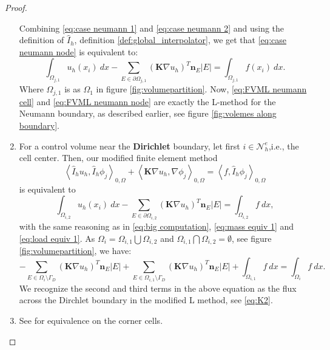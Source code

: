 \documentclass[../Main/main.tex]{subfiles}
\begin{document}
\begin{proof}
\begin{enumerate}
			Combining \eqref{eq:case neumann 1} and \eqref{eq:case neumann 2} and using the definition of $\hat{I}_h$, definition \ref{def:global_interpolator}, we get that \eqref{eq:case neumann node} is equivalent to:
			\begin{equation}\label{eq:FVML neumann node}
				\int_{\Omega_{j,1}}u_h(x_i) \ dx - \sum_{E\in \partial \Omega_{j,1}} (\bm{K}\nabla u_h)^T\bm{n}_E |E| = \int_{\Omega_{j,1}}f(x_i) \ dx.
			\end{equation}
			Where $\Omega_{j,1}$ is as $\Omega_1$ in figure \ref{fig:volumepartition}. Now, \eqref{eq:FVML neumann cell} and \eqref{eq:FVML neumann node} are exactly the L-method for the Neumann boundary, as described earlier, see figure \ref{fig:volemes along boundary}.  
			\item For a control volume near the \textbf{Dirichlet} boundary, let first $i\in \mathcal{N}_h^e$,i.e., the cell center. Then, our modified finite element method
			\begin{equation}
				\left \langle \hat{I}_h u_h,\hat{I}_h \phi_j \right \rangle_{0,\Omega} +   \left \langle\bm{K} \nabla u_h,\nabla \phi_j \right \rangle_{0,\Omega} = \left \langle f,\hat{I}_h \phi_j \right \rangle_{0,\Omega}
			\end{equation}   
			is equivalent to 
			\begin{equation} 
				\int_{\Omega_{i,2}} u_h (x_i) \ dx- \sum_{E\in \partial \Omega_{i,2}} (\pmb{K}\nabla u_h)^T\bm{n}_E |E| = \int_{\Omega_{i,2}} f \ dx,
			\end{equation} 
			with the same reasoning as in \eqref{eq:big computation}, \eqref{eq:mass equiv 1} and \eqref{eq:load equiv 1}. As $\Omega_i = \Omega_{i,1}\bigcup \Omega_{i,2}$ and $\Omega_{i,1}\bigcap \Omega_{i,2}= \emptyset$, see figure \ref{fig:volumepartition}, we have:
			\begin{equation}
				-\sum_{E\in \Omega_i \setminus \Gamma_D}(\pmb{K}\nabla u_h)^T\bm{n}_E |E| + \sum_{E\in \Omega_{i,1} \setminus \Gamma_D}(\pmb{K}\nabla u_h)^T\bm{n}_E |E| + \int_{\Omega_{i,1}} f \ dx = \int_{\Omega_i} f \ dx.
			\end{equation}
			We recognize the second and third terms in the above equation as the flux across the Dirchlet boundary in the modified L method, see \eqref{eq:K2}.
			\item See \cite{https://doi.org/10.1002/num.20525} for equivalence on the corner cells.
		\end{enumerate}
	\end{proof}
\end{document}
